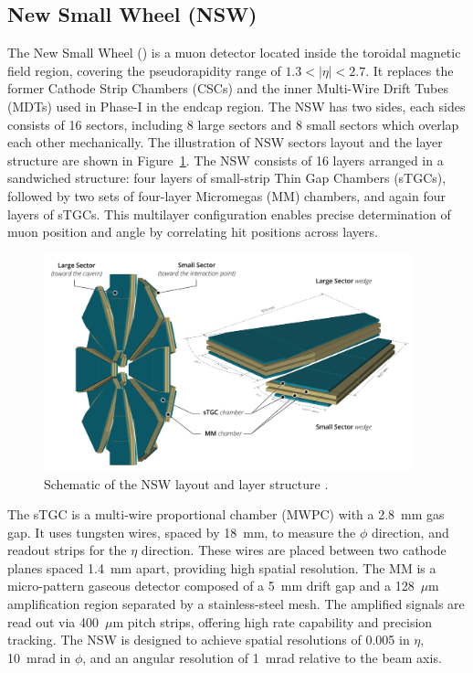 \subsection{New Small Wheel (NSW)}
The New Small Wheel (\NSW) is a muon detector located inside the toroidal magnetic field region, covering the pseudorapidity range of $1.3 < |\eta| < 2.7$. It replaces the former Cathode Strip Chambers (CSCs) and the inner Multi-Wire Drift Tubes (MDTs) used in Phase-I in the endcap region. The NSW has two sides, each sides consists of 16 sectors, including 8 large sectors and 8 small sectors which overlap each other mechanically. The illustration of NSW sectors layout and the layer structure are shown in Figure~\ref{fig:NSW}. The NSW consists of 16 layers arranged in a sandwiched structure: four layers of small-strip Thin Gap Chambers (sTGCs), followed by two sets of four-layer Micromegas (MM) chambers, and again four layers of sTGCs. This multilayer configuration enables precise determination of muon position and angle by correlating hit positions across layers.

\begin{figure}[htbp]
  \centering
  \includegraphics[width=0.95\textwidth]{figs/chapter2/NSW.png}
  \caption{Schematic of the NSW layout and layer structure \cite{ATLASRun3Detector}.}
  \label{fig:NSW}
\end{figure}

The sTGC is a multi-wire proportional chamber (MWPC) with a 2.8~mm gas gap. It uses tungsten wires, spaced by 18~mm, to measure the $\phi$ direction, and readout strips for the $\eta$ direction. These wires are placed between two cathode planes spaced 1.4~mm apart, providing high spatial resolution. The MM is a micro-pattern gaseous detector composed of a 5~mm drift gap and a 128~$\mu$m amplification region separated by a stainless-steel mesh. The amplified signals are read out via 400~$\mu$m pitch strips, offering high rate capability and precision tracking. 
The NSW is designed to achieve spatial resolutions of 0.005 in $\eta$, 10~mrad in $\phi$, and an angular resolution of 1~mrad relative to the beam axis.

